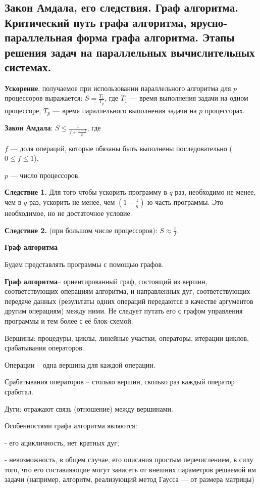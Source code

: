 \subsection{Закон Амдала, его следствия. Граф алгоритма. Критический путь графа алгоритма, ярусно-параллельная форма графа алгоритма. Этапы решения задач на параллельных вычислительных системах.}


\textbf{Ускорение}, получаемое при использовании параллельного алгоритма для $p$ процессоров выражается: $S = \frac{T_1}{T_p}$, где $T_1$ --- время выполнения задачи на одном процессоре, $T_p$ --- время параллельного выполнения задачи на $p$ процессорах.

\textbf{Закон Амдала}:
$S \leqslant \frac{1}{f + \frac{1 - f}{p}}$, где

$f$ --- доля операций, которые обязаны быть выполнены последовательно ($0 \leqslant f \leqslant 1$), 

$p$ --- число процессоров.

\textbf{Следствие 1.} 
Для того чтобы ускорить программу в $q$ раз, необходимо не менее, чем в $q$ раз, ускорить не менее, чем $\left(1 - \frac{1}{q}\right)$-ю часть программы. Это необходимое, но не достаточное условие.

\textbf{Следствие 2.} (при большом числе процессоров): 
$S \approx \frac{1}{f}$.

\textbf{Граф алгоритма}

Будем представлять программы с помощью графов.

\textbf{Граф алгоритма}-- ориентированный граф, состоящий из вершин, соответствующих операциям алгоритма, и направленных дуг, соответствующих передаче данных (результаты одних операций передаются в качестве аргументов другим операциям) между ними. Не следует путать его с графом управления программы и тем более с её блок-схемой.

Вершины: процедуры, циклы, линейные участки, операторы, итерации циклов, срабатывания операторов. 

Операции -- одна вершина для каждой операции. 

Срабатывания операторов -- столько вершин, сколько раз каждый оператор сработал.

Дуги: отражают связь (отношение) между вершинами.

Особенностями графа алгоритма являются:

 - его ацикличность, нет кратных дуг;
 
 - невозможность, в общем случае, его описания простым перечислением, в силу того, что его составляющие могут зависеть от внешних параметров решаемой им задачи (например, алгоритм, реализующий метод Гаусса — от размера матрицы)


